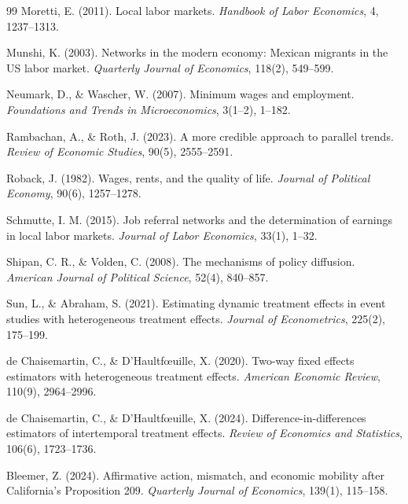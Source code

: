 \documentclass[12pt]{article}
\begin{document}
\begin{thebibliography}{99}
Moretti, E. (2011).
Local labor markets.
\textit{Handbook of Labor Economics}, 4, 1237--1313.

Munshi, K. (2003).
Networks in the modern economy: Mexican migrants in the US labor market.
\textit{Quarterly Journal of Economics}, 118(2), 549--599.

Neumark, D., \& Wascher, W. (2007).
Minimum wages and employment.
\textit{Foundations and Trends in Microeconomics}, 3(1--2), 1--182.

Rambachan, A., \& Roth, J. (2023).
A more credible approach to parallel trends.
\textit{Review of Economic Studies}, 90(5), 2555--2591.

Roback, J. (1982).
Wages, rents, and the quality of life.
\textit{Journal of Political Economy}, 90(6), 1257--1278.

Schmutte, I. M. (2015).
Job referral networks and the determination of earnings in local labor markets.
\textit{Journal of Labor Economics}, 33(1), 1--32.

Shipan, C. R., \& Volden, C. (2008).
The mechanisms of policy diffusion.
\textit{American Journal of Political Science}, 52(4), 840--857.

Sun, L., \& Abraham, S. (2021).
Estimating dynamic treatment effects in event studies with heterogeneous treatment effects.
\textit{Journal of Econometrics}, 225(2), 175--199.

de Chaisemartin, C., \& D'Haultf{\oe}uille, X. (2020).
Two-way fixed effects estimators with heterogeneous treatment effects.
\textit{American Economic Review}, 110(9), 2964--2996.

de Chaisemartin, C., \& D'Haultf{\oe}uille, X. (2024).
Difference-in-differences estimators of intertemporal treatment effects.
\textit{Review of Economics and Statistics}, 106(6), 1723--1736.

Bleemer, Z. (2024).
Affirmative action, mismatch, and economic mobility after California's Proposition 209.
\textit{Quarterly Journal of Economics}, 139(1), 115--158.


\end{thebibliography}
\end{document}
